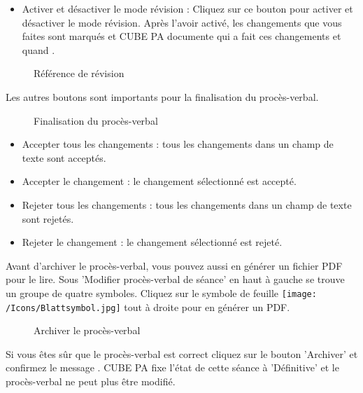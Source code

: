 \begin{itemize}
\item
Activer et désactiver le mode révision  : Cliquez sur ce bouton pour activer et désactiver le mode révision. Après l'avoir activé, les changements que vous faites sont marqués  et CUBE PA documente qui a fait ces changements et quand .
\end{itemize}

\begin{figure}[H]
\caption{Référence de révision}
\end{figure}

Les autres boutons sont importants pour la finalisation du procès-verbal.

\begin{figure}[H]
\caption{Finalisation du procès-verbal}
\end{figure}

\begin{itemize}
\item
Accepter tous les changements  : tous les changements dans un champ de texte sont acceptés.
\item
Accepter le changement  : le changement sélectionné est accepté.
\item
Rejeter tous les changements  : tous les changements dans un champ de texte sont rejetés.
\item
Rejeter le changement  : le changement sélectionné est rejeté.
\end{itemize}

\vspace{\baselineskip}

Avant d'archiver le procès-verbal, vous pouvez aussi en générer un fichier PDF pour le lire. Sous 'Modifier procès-verbal de séance' en haut à gauche se trouve un groupe de quatre symboles. Cliquez sur le symbole de feuille \texttt{[image: /Icons/Blattsymbol.jpg]}  tout à droite pour en générer un PDF.

\begin{figure}[H]
\caption{Archiver le procès-verbal}
\end{figure}

Si vous êtes sûr que le procès-verbal est correct cliquez sur le bouton 'Archiver'  et confirmez le message . CUBE PA fixe l'état de cette séance à 'Définitive' et le procès-verbal ne peut plus être modifié.

